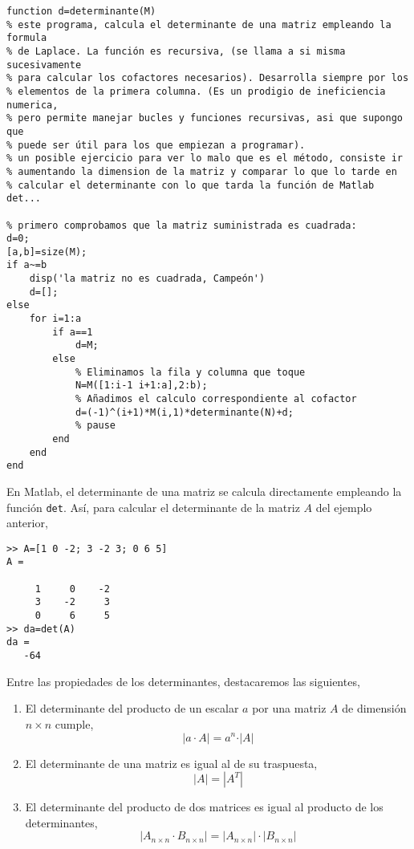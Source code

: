 \begin{lstlisting}
function d=determinante(M)
% este programa, calcula el determinante de una matriz empleando la formula
% de Laplace. La función es recursiva, (se llama a si misma sucesivamente
% para calcular los cofactores necesarios). Desarrolla siempre por los
% elementos de la primera columna. (Es un prodigio de ineficiencia numerica,
% pero permite manejar bucles y funciones recursivas, asi que supongo que
% puede ser útil para los que empiezan a programar).
% un posible ejercicio para ver lo malo que es el método, consiste ir
% aumentando la dimension de la matriz y comparar lo que lo tarde en
% calcular el determinante con lo que tarda la función de Matlab det...

% primero comprobamos que la matriz suministrada es cuadrada:
d=0;
[a,b]=size(M);
if a~=b
    disp('la matriz no es cuadrada, Campeón')
    d=[];
else
    for i=1:a
        if a==1
            d=M;
        else
            % Eliminamos la fila y columna que toque
            N=M([1:i-1 i+1:a],2:b);
            % Añadimos el calculo correspondiente al cofactor
            d=(-1)^(i+1)*M(i,1)*determinante(N)+d;
            % pause
        end
    end
end

\end{lstlisting}

En Matlab, el determinante de una matriz se calcula directamente empleando la función \texttt{det}. Así, para calcular el determinante de la matriz $A$ del ejemplo anterior,
\begin{verbatim}
>> A=[1 0 -2; 3 -2 3; 0 6 5]
A =

     1     0    -2
     3    -2     3
     0     6     5
>> da=det(A)
da =
   -64
\end{verbatim}

Entre las propiedades de los determinantes, destacaremos las siguientes,
\begin{enumerate}
\item El determinante del producto de un escalar $a$ por una matriz $A$ de dimensión $n\times n$ cumple,
\begin{equation*}
\left\vert a\cdot A \right\vert =a^n\cdot \vert A \vert
\end{equation*}
\item El determinante de una matriz es igual al de su traspuesta,
\begin{equation*}
\vert A \vert =\left\vert A^T \right\vert
\end{equation*}

\item El determinante del producto de dos matrices es igual al producto de los determinantes,
\begin{equation*}
\left\vert A_{n\times n} \cdot  B_{n\times n} \right\vert = \left\vert A_{n\times n} \right\vert \cdot \left\vert B_{n\times n} \right\vert 
\end{equation*}
\end{enumerate}

